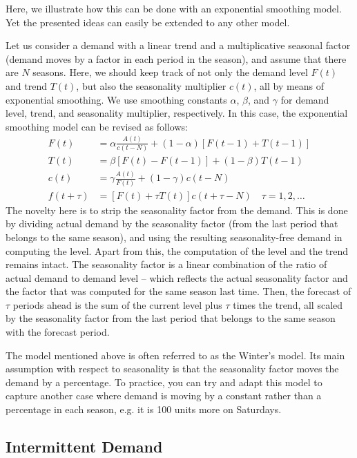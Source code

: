   \begin{solution}   
   Here, we illustrate how this can be done with an exponential smoothing model. Yet the presented ideas can easily be extended to any other model. 
 
Let us consider a demand with a linear trend and a multiplicative seasonal factor (demand moves by a factor in each period in the season), and assume that there are $N$ seasons. Here, we should keep track of not only the demand level $F(t)$ and trend $T(t)$, but also the seasonality multiplier $c(t)$, all by means of exponential smoothing. We use smoothing constants $\alpha$, $\beta$, and $\gamma$ for demand level, trend, and seasonality multiplier, respectively. In this case, the exponential smoothing model can be revised as follows:
\begin{align*}
F(t) & = \alpha  \frac{A(t)}{c(t-N)}+ (1-\alpha) [F(t-1) + T(t-1)] \\
T(t) & = \beta [F(t)-F(t-1)] + (1-\beta) T(t-1) \\
c(t) & = \gamma \frac{A(t)}{F(t)} + (1-\gamma) c(t-N) \\
f(t+\tau) & = [F(t) + \tau T(t)] c(t+\tau-N) \quad \tau = 1,2,\ldots
\end{align*}
The novelty here is to strip the seasonality factor from the demand. This is done by dividing actual demand by the seasonality factor (from the last period that belongs to the same season), and using the resulting seasonality-free demand in computing the level. Apart from this, the computation of the level and the trend remains intact. The seasonality factor is a linear combination of the ratio of actual demand to demand level -- which reflects the actual seasonality factor and the factor that was computed for the same season last time. Then, the forecast of $\tau$ periods ahead is the sum of the current level plus $\tau$ times the trend, all scaled by the seasonality factor from the last period that belongs to the same season with the forecast period. 

The model mentioned above is often referred to as the Winter's model. Its main assumption with respect to seasonality is that the seasonality factor moves the demand by a percentage. To practice, you can try and adapt this model to capture another case where demand is moving by a constant rather than a percentage in each season, e.g. it is 100 units more on Saturdays. 

  \end{solution}
  
  
\subsection{Intermittent Demand}

